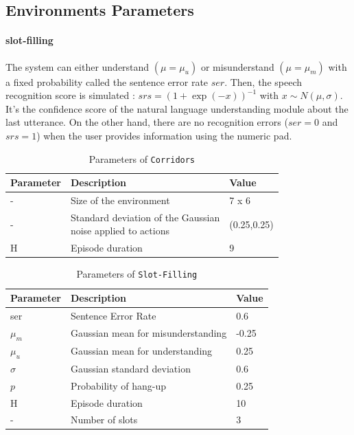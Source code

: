 \subsection{Environments Parameters}
\label{sec:env-parameters}

\paragraph{slot-filling} The system can either understand $(\mu=\mu_u)$ or misunderstand $(\mu=\mu_m)$ with a fixed probability called the sentence error rate $ser$. Then, the speech recognition score is simulated \citep{Khouzaimi2015}: $srs = (1+\exp(-x))^{-1}$ with $x\sim N(\mu, \sigma)$. It's the confidence score of the natural language understanding module about the last utterance. On the other hand, there are no recognition errors ($ser=0$ and $srs=1$) when the user provides information using the numeric pad.

\begin{table}[ht!]
    \centering
    \begin{tabularx}{1.0\textwidth}{lll}
        \toprule
        Parameter & Description & Value\tabularnewline
        \midrule
        - & Size of the environment & 7 x 6\tabularnewline
        - & \makecell[l]{Standard deviation of the Gaussian \\noise applied to actions} & (0.25,0.25)\tabularnewline
        H & Episode duration & 9\tabularnewline
        \bottomrule
    \end{tabularx}
    \caption{Parameters of \texttt{Corridors}}
\end{table}

\begin{table}[ht!]
    \centering
    \begin{tabularx}{1.0\textwidth}{lll}
        \toprule
        Parameter & Description & Value\tabularnewline
        \midrule
        ser & Sentence Error Rate & 0.6\tabularnewline
        $\mu_m$& Gaussian mean for misunderstanding & -0.25\tabularnewline
        $\mu_u$& Gaussian mean for understanding & 0.25\tabularnewline
        $\sigma$& Gaussian standard deviation & 0.6\tabularnewline
        $p$& Probability of hang-up & 0.25\tabularnewline
        H & Episode duration & 10\tabularnewline
        - & Number of slots & 3\tabularnewline
        \bottomrule
    \end{tabularx}
    \caption{Parameters of \texttt{Slot-Filling}}
\end{table}



